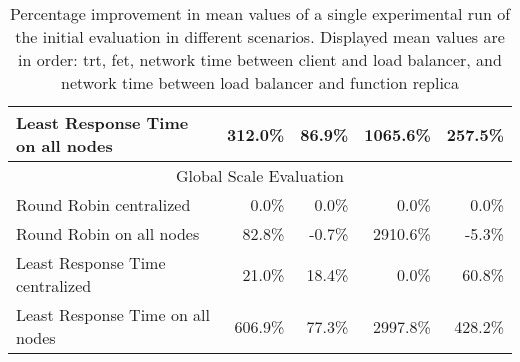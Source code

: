 \begin{table}[]
\begin{tabular}{lrrrr}
Least Response Time on all nodes & 312.0\%                          & 86.9\%                           & 1065.6\%                               & 257.5\%                                \\ \hline
\multicolumn{5}{c}{Global Scale Evaluation}                                                                                                                                              \\ \hline
Round Robin centralized          & 0.0\%                            & 0.0\%                            & 0.0\%                                  & 0.0\%                                  \\
Round Robin on all nodes         & 82.8\%                           & -0.7\%                           & 2910.6\%                               & -5.3\%                                 \\
Least Response Time centralized  & 21.0\%                           & 18.4\%                           & 0.0\%                                  & 60.8\%                                 \\
Least Response Time on all nodes & 606.9\%                          & 77.3\%                           & 2997.8\%                               & 428.2\%                                \\ \hline
\end{tabular}
\caption{ Percentage improvement in mean values of a single experimental run of the initial evaluation in different scenarios. Displayed mean values are in order: \gls{trt}, \gls{fet}, network time between client and load balancer, and network time between load balancer and function replica}
\label{tab:initial_eval_results_mean}
\end{table}


